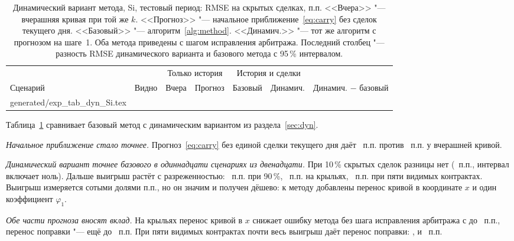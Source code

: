\documentclass{article}
\makeatletter
\newcommand{\rows}[1]{\@@input generated/#1 }
\makeatother
\begin{document}
\begin{table}[h]
\caption{Динамический вариант метода, Si, тестовый период: RMSE на скрытых сделках, п.п. <<Вчера>> "--- вчерашняя кривая при той же $k$. <<Прогноз>> "--- начальное приближение~\eqref{eq:carry} без сделок текущего дня. <<Базовый>> "--- алгоритм~\ref{alg:method}. <<Динамич.>> "--- тот же алгоритм с прогнозом на шаге~1. Оба метода приведены с шагом исправления арбитража. Последний столбец "--- разность RMSE динамического варианта и базового метода с 95\,\% интервалом.}\label{tab:dyn}
\centering\footnotesize
\setlength{\tabcolsep}{4pt}
\begin{tabular}{lrrrrrl}
\toprule
 & & \multicolumn{2}{c}{Только история} & \multicolumn{2}{c}{История и сделки} & \\
\cmidrule(lr){3-4}\cmidrule(lr){5-6}
Сценарий & Видно & Вчера & Прогноз & Базовый & Динамич. & Динамич. $-$ базовый \\
\midrule
\rows{exp_tab_dyn_Si.tex}
\bottomrule
\end{tabular}
\end{table}

Таблица~\ref{tab:dyn} сравнивает базовый метод с динамическим вариантом из раздела~\ref{sec:dyn}.

\emph{Начальное приближение стало точнее.} Прогноз~\eqref{eq:carry} без единой сделки текущего дня даёт ~п.п. против ~п.п. у вчерашней кривой.

\emph{Динамический вариант точнее базового в одиннадцати сценариях из двенадцати.} При 10\,\% скрытых сделок разницы нет (~п.п., интервал включает ноль). Дальше выигрыш растёт с разреженностью: ~п.п. при 90\,\%, ~п.п. на крыльях, ~п.п. при пяти видимых контрактах. Выигрыш измеряется сотыми долями п.п., но он значим и получен дёшево: к методу добавлены перенос кривой в координате $x$ и один коэффициент $\varphi_1$.

\emph{Обе части прогноза вносят вклад.} На крыльях перенос кривой в $x$ снижает ошибку метода без шага исправления арбитража с  до ~п.п., перенос поправки "--- ещё до ~п.п. При пяти видимых контрактах почти весь выигрыш даёт перенос поправки: ,  и ~п.п.
\end{document}

